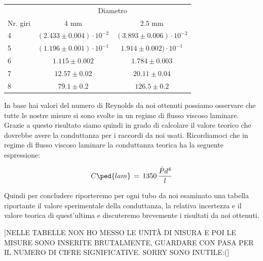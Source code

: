 \begin{center}
    \begin{tabular}{l c c}
        \toprule
        & \multicolumn{2}{c}{Diametro} \\
        Nr. giri & 4 mm & 2.5 mm \\
        \midrule
        4 & $(2.433 \pm 0.004) \cdot 10^{-2}$ & $(3.893 \pm 0.006) \cdot 10^{-2}$ \\
        5 & $(1.196 \pm 0.001) \cdot 10^{-1}$ & $1.914 \pm 0.002) \cdot 10^{-1}$  \\
        6 & $1.115 \pm 0.002$ &                 $1.784 \pm 0.003$                 \\
        7 & $12.57 \pm 0.02$ &                  $20.11 \pm 0.04$                  \\
        8 & $79.1 \pm 0.2$ &                    $126.5 \pm 0.2$                   \\
        \bottomrule
    \end{tabular}
\end{center}

In base hai valori del numero di Reynolds da noi ottenuti possiamo osservare che tutte le nostre misure si sono svolte in un regime di flusso viscoso laminare. Grazie a questo risultato siamo quindi in grado di calcolare il valore teorico che dovrebbe avere la conduttanza per i raccordi da noi usati.
Ricordiamoci che in regime di flusso viscoso laminare la conduttanza teorica ha la seguente espressione:

\begin{equation}
    C\ped{lam} \,=\, 1350\,\frac{\bar{P}d^4}{l}
\end{equation}

Quindi per concludere riporteremo per ogni tubo da noi esaminato una tabella riportante il valore sperimentale della conduttanza, la relativa incertezza e il valore teorica di quest'ultima e discuteremo brevemente i risultati da noi ottenuti.

[NELLE TABELLE NON HO MESSO LE UNITÀ DI NISURA E POI LE MISURE SONO INSERITE BRUTALMENTE, GUARDARE CON PASA PER IL NUMERO DI CIFRE SIGNIFICATIVE. SORRY SONO INUTILE:(]

